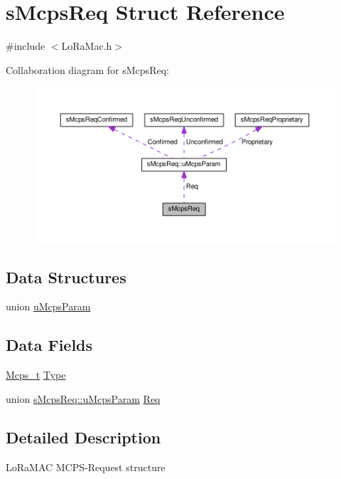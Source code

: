 \hypertarget{structsMcpsReq}{}\section{s\+Mcps\+Req Struct Reference}
\label{structsMcpsReq}


{\ttfamily \#include $<$Lo\+Ra\+Mac.\+h$>$}



Collaboration diagram for s\+Mcps\+Req\+:
\nopagebreak
\begin{figure}[H]
\begin{center}
\leavevmode
\includegraphics[width=350pt]{structsMcpsReq__coll__graph}
\end{center}
\end{figure}
\subsection*{Data Structures}
\begin{DoxyCompactItemize}
\item 
union \hyperlink{unionsMcpsReq_1_1uMcpsParam}{u\+Mcps\+Param}
\end{DoxyCompactItemize}
\subsection*{Data Fields}
\begin{DoxyCompactItemize}
\item 
\hyperlink{group__LORAMAC_ga670d0c87a52aeb13391f303a4cf94f00}{Mcps\+\_\+t} \hyperlink{structsMcpsReq_a9c0265d5c764fb2b0119c932b896f826}{Type}
\item 
union \hyperlink{unionsMcpsReq_1_1uMcpsParam}{s\+Mcps\+Req\+::u\+Mcps\+Param} \hyperlink{structsMcpsReq_a36a00aadc44825e3235a1652bd7911d6}{Req}
\end{DoxyCompactItemize}


\subsection{Detailed Description}
Lo\+Ra\+M\+AC M\+C\+P\+S-\/\+Request structure 

